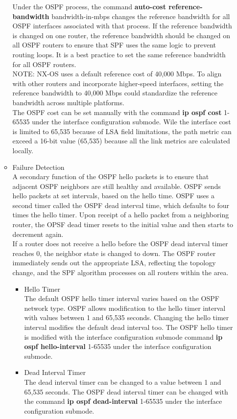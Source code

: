 \documentclass{article}
\begin{document}
\begin{itemize}
\begin{itemize}
				Under the OSPF process, the command \textbf{auto-cost reference-bandwidth} bandwidth-in-mbps changes the reference bandwidth for all OSPF interfaces associated with that process. If the reference bandwidth is changed on one router, the reference bandwidth should be changed on all OSPF routers to ensure that SPF uses the same logic to prevent routing loops. It is a best practice to set the same reference bandwidth for all OSPF routers.\\

				NOTE: NX-OS uses a default reference cost of 40,000 Mbps. To align with other routers and incorporate higher-speed interfaces, setting the reference bandwidth to 40,000 Mbps could standardize the reference bandwidth across multiple platforms.\\

				The OSPF cost can be set manually with the command \textbf{ip ospf cost} 1-65535 under the interface configuration submode. Wile the interface cost is limited to 65,535 because of LSA field limitations, the path metric can exceed a 16-bit value (65,535) because all the link metrics are calculated locally.

			\item Failure Detection\\
				A secondary function of the OSPF hello packets is to ensure that adjacent OSPF neighbors are still healthy and available. OSPF sends hello packets at set intervals, based on the hello time. OSPF uses a second timer called the OSPF dead interval time, which defaults to four times the hello timer. Upon receipt of a hello packet from a neighboring router, the OPSF dead timer resets to the initial value and then starts to decrement again.\\

				If a router does not receive a hello before the OSPF dead interval timer reaches 0, the neighbor state is changed to down. The OSPF router immediately sends out the appropriate LSA, reflecting the topology change, and the SPF algorithm processes on all routers within the area.

				\begin{itemize}
					\item Hello Timer\\
						The default OSPF hello timer interval varies based on the OSPF network type. OSPF allows modification to the hello timer interval with values between 1 and 65,535 seconds. Changing the hello timer interval modifies the default dead interval too. The OSPF hello timer is modified with the interface configuration submode command \textbf{ip ospf hello-interval} 1-65535 under the interface configuration submode.	
					\item Dead Interval Timer\\
						The dead interval timer can be changed to a value between 1 and 65,535 seconds. The OSPF dead interval timer can be changed with the command \textbf{ip ospf dead-interval} 1-65535 under the interface configuration submode.
					

\end{itemize}
\end{itemize}
\end{itemize}
\end{document}
